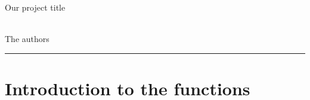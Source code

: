 \documentclass[12pt]{article}
\begin{document}
\begin{center}
    \huge{Our project title}
    
    \\[10pt]
    
    \large{The authors}
\end{center}
\rule{\textwidth}{0.5pt}

\section{Introduction to the functions}

\end{document}
